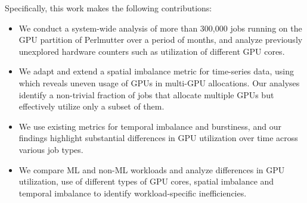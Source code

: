 
Specifically, this work makes the following contributions:
%
\begin{itemize}
  \item We conduct a system-wide analysis of more than 300,000 jobs running on
        the GPU partition of Perlmutter over a period of  months, and
        analyze previously unexplored hardware counters such as utilization of
        different GPU cores.
  \item We adapt and extend a spatial imbalance metric for time-series data,
        using which reveals uneven usage of GPUs in multi-GPU allocations. Our analyses
        identify a non-trivial fraction of jobs that allocate multiple GPUs but
        effectively utilize only a subset of them.
  \item We use existing metrics for temporal imbalance and burstiness, and our
        findings highlight substantial differences in GPU utilization over time across
        various job types.
  \item We compare ML and non-ML workloads and analyze differences in GPU
        utilization, use of different types of GPU cores, spatial imbalance and
        temporal imbalance to identify workload-specific inefficiencies.
\end{itemize}
